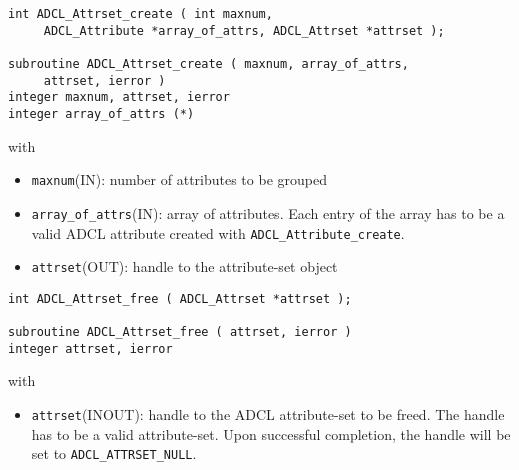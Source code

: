 \hspace{1cm}
\begin{verbatim}
int ADCL_Attrset_create ( int maxnum, 
     ADCL_Attribute *array_of_attrs, ADCL_Attrset *attrset );

subroutine ADCL_Attrset_create ( maxnum, array_of_attrs, 
     attrset, ierror )
integer maxnum, attrset, ierror
integer array_of_attrs (*)
\end{verbatim}
with
\begin{itemize}
\item {\tt maxnum}(IN): number of attributes to be grouped
\item {\tt array\_of\_attrs}(IN): array of attributes. Each entry of the array has to be a 
	valid ADCL attribute created with {\tt ADCL\_Attribute\_create}.
\item {\tt attrset}(OUT): handle to the attribute-set object
\end{itemize}
\hspace{1cm}
\begin{verbatim}
int ADCL_Attrset_free ( ADCL_Attrset *attrset );

subroutine ADCL_Attrset_free ( attrset, ierror )
integer attrset, ierror
\end{verbatim}
with
\begin{itemize}
\item {\tt attrset}(INOUT): handle to the ADCL attribute-set to be freed. The handle has to be a valid attribute-set.
    	Upon successful completion, the handle will be set to {\tt ADCL\_ATTRSET\_NULL}.
\end{itemize}